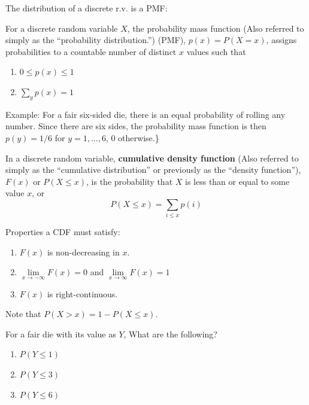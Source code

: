 \documentclass[]{book}
\providecommand{\tightlist}{%
  \setlength{\itemsep}{0pt}\setlength{\parskip}{0pt}}
\theoremstyle{definition}
\theoremstyle{definition}
\theoremstyle{definition}
\theoremstyle{remark}
\let\BeginKnitrBlock\begin \let\EndKnitrBlock\end
\begin{document}
The distribution of a discrete r.v. is a PMF:

\BeginKnitrBlock{definition}[Probability Mass Function]
\protect\hypertarget{def:unnamed-chunk-76}{}{\label{def:unnamed-chunk-76}
{} } For a discrete random
variable \(X\), the probability mass function (Also referred to simply
as the ``probability distribution.'') (PMF), \(p(x)=P(X=x)\), assigns
probabilities to a countable number of distinct \(x\) values such that

\begin{enumerate}
\def\labelenumi{\arabic{enumi}.}
\tightlist
\item
  \(0\le p(x)\le 1\)
\item
  \(\sum\limits_y p(x)=1\)
\end{enumerate}
\EndKnitrBlock{definition}

Example: For a fair six-sided die, there is an equal probability of
rolling any number. Since there are six sides, the probability mass
function is then \(p(y)=1/6\) for \(y=1,\ldots,6\), 0 otherwise.\}

In a discrete random variable, \textbf{cumulative density function}
(Also referred to simply as the ``cumulative distribution'' or
previously as the ``density function''), \(F(x)\) or \(P(X\le x)\), is
the probability that \(X\) is less than or equal to some value \(x\), or
\[P(X\le x)=\sum\limits_{i\le x} p(i)\]

Properties a CDF must satisfy:

\begin{enumerate}
\def\labelenumi{\arabic{enumi}.}
\tightlist
\item
  \(F(x)\) is non-decreasing in \(x\).
\item
  \(\lim\limits_{x \to -\infty} F(x) = 0\) and
  \(\lim\limits_{x \to \infty} F(x) = 1\)
\item
  \(F(x)\) is right-continuous.
\end{enumerate}

Note that \(P(X > x) = 1 - P(X \le x)\).

\BeginKnitrBlock{example}
\protect\hypertarget{exm:unnamed-chunk-77}{}{\label{exm:unnamed-chunk-77}
}For a fair die with its value as \(Y\), What are the following?

\begin{enumerate}
\def\labelenumi{\arabic{enumi}.}
\tightlist
\item
  \(P(Y\le 1)\)
\item
  \(P(Y\le 3)\)
\item
  \(P(Y\le 6)\)
\end{enumerate}
\EndKnitrBlock{example}
\end{document}
